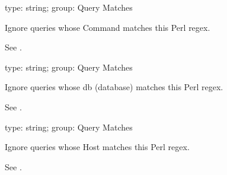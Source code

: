 \documentclass[letterpaper,10pt,english]{sphinxmanual}
\begin{document}
\begin{fulllineitems}
\label{\detokenize{mariadb-kill:cmdoption-mariadb-kill-ignore-command}}
type: string; group: Query Matches

Ignore queries whose Command matches this Perl regex.

See {\hyperref[\detokenize{mariadb-kill:cmdoption-mariadb-kill-match-command}]{}}.

\end{fulllineitems}


\begin{fulllineitems}
\label{\detokenize{mariadb-kill:cmdoption-mariadb-kill-ignore-db}}
type: string; group: Query Matches

Ignore queries whose db (database) matches this Perl regex.

See {\hyperref[\detokenize{mariadb-kill:cmdoption-mariadb-kill-match-db}]{}}.

\end{fulllineitems}


\begin{fulllineitems}
\label{\detokenize{mariadb-kill:cmdoption-mariadb-kill-ignore-host}}
type: string; group: Query Matches

Ignore queries whose Host matches this Perl regex.

See {\hyperref[\detokenize{mariadb-kill:cmdoption-mariadb-kill-match-host}]{}}.

\end{fulllineitems}
\end{document}
